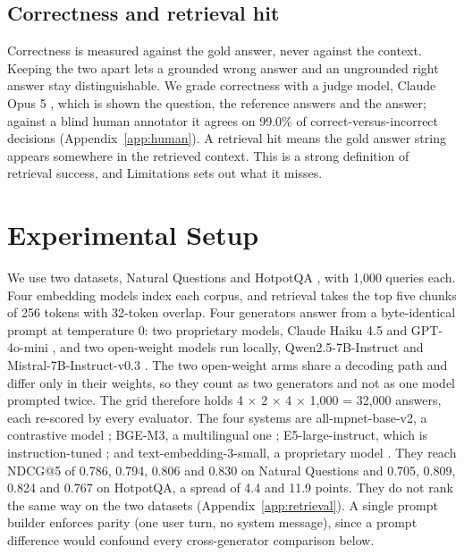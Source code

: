 \documentclass[11pt]{article}
\begin{document}
\subsection{Correctness and retrieval hit}
\label{sec:def-correct}

Correctness is measured against the gold answer, never against the context. Keeping the two apart lets a grounded wrong answer and an ungrounded right answer stay distinguishable. We grade correctness with a judge model, Claude Opus 5 \citep{anthropic-2026-opus5}, which is shown the question, the reference answers and the answer; against a blind human annotator it agrees on 99.0\% of correct-versus-incorrect decisions (Appendix~\ref{app:human}). A retrieval hit means the gold answer string appears somewhere in the retrieved context. This is a strong definition of retrieval success, and Limitations sets out what it misses.


\section{Experimental Setup}
\label{sec:setup}

We use two datasets, Natural Questions \citep{kwiatkowski-etal-2019} and HotpotQA \citep{yang-etal-2018}, with 1,000 queries each. Four embedding models index each corpus, and retrieval takes the top five chunks of 256 tokens with 32-token overlap. Four generators answer from a byte-identical prompt at temperature 0: two proprietary models, Claude Haiku 4.5 \citep{anthropic-2025-haiku} and GPT-4o-mini \citep{openai-2024-gpt4omini}, and two open-weight models run locally, Qwen2.5-7B-Instruct \citep{yang-etal-2024-qwen25} and Mistral-7B-Instruct-v0.3 \citep{jiang-etal-2023-mistral}. The two open-weight arms share a decoding path and differ only in their weights, so they count as two generators and not as one model prompted twice. The grid therefore holds 4 $\times$ 2 $\times$ 4 $\times$ 1,000 = 32,000 answers, each re-scored by every evaluator. The four systems are all-mpnet-base-v2, a contrastive model \citep{reimers-gurevych-2019-sentence,song-etal-2020-mpnet}; BGE-M3, a multilingual one \citep{chen-etal-2024-m3}; E5-large-instruct, which is instruction-tuned \citep{wang-etal-2024-multilingual-e5}; and text-embedding-3-small, a proprietary model \citep{openai-2024-embeddings}. They reach NDCG@5 of 0.786, 0.794, 0.806 and 0.830 on Natural Questions and 0.705, 0.809, 0.824 and 0.767 on HotpotQA, a spread of 4.4 and 11.9 points. They do not rank the same way on the two datasets (Appendix~\ref{app:retrieval}). A single prompt builder enforces parity (one user turn, no system message), since a prompt difference would confound every cross-generator comparison below.
\end{document}
